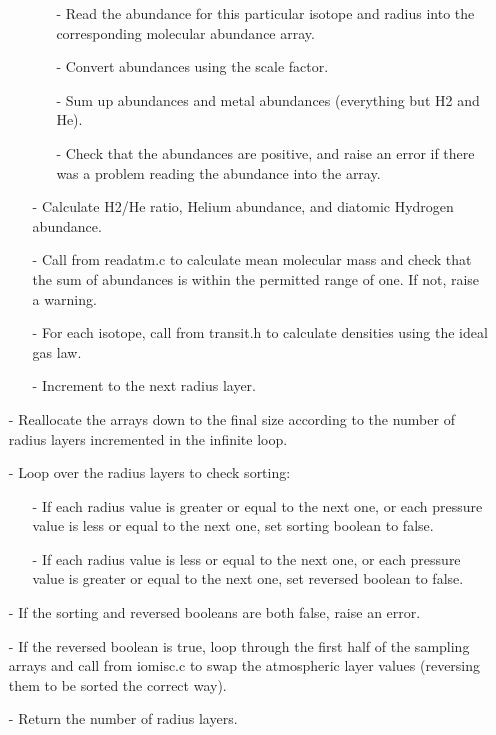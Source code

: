 \documentclass[letterpaper,12pt]{article}
\begin{document}
\begin{enumerate}[leftmargin=10pt, noitemsep, parsep=0pt, topsep=0ex]
\begin{enumerate}[leftmargin=10pt, noitemsep, parsep=0pt, topsep=0ex]
\begin{enumerate}[leftmargin=10pt, noitemsep, parsep=0pt, topsep=0ex]
\item[-] Read the abundance for this particular isotope and radius into the corresponding molecular abundance array.
\item[-] Convert abundances using the scale factor.
\item[-] Sum up abundances and metal abundances (everything but H2 and He).
\item[-] Check that the abundances are positive, and raise an error if there was a problem reading the abundance into the array.
\end{enumerate}
\item[-] Calculate H2/He ratio, Helium abundance, and diatomic Hydrogen abundance.
\item[-] Call  from readatm.c to calculate mean molecular mass and check that the sum of abundances is within the permitted range of one. If not, raise a warning.
\item[-] For each isotope, call  from transit.h to calculate densities using the ideal gas law.
\item[-] Increment to the next radius layer.
\end{enumerate}
\item[-] Reallocate the arrays down to the final size according to the number of radius layers incremented in the infinite loop.
\item[-] Loop over the radius layers to check sorting:
\begin{enumerate}[leftmargin=10pt, noitemsep, parsep=0pt, topsep=0ex]
\item[-] If each radius value is greater or equal to the next one, or each pressure value is less or equal to the next one, set sorting boolean to false.
\item[-] If each radius value is less or equal to the next one, or each pressure value is greater or equal to the next one, set reversed boolean to false.
\end{enumerate}
\item[-] If the sorting and reversed booleans are both false, raise an error.
\item[-] If the reversed boolean is true, loop through the first half of the sampling arrays and call  from iomisc.c to swap the atmospheric layer values (reversing them to be sorted the correct way).
\item[-] Return the number of radius layers.
\end{enumerate}
\end{document}
